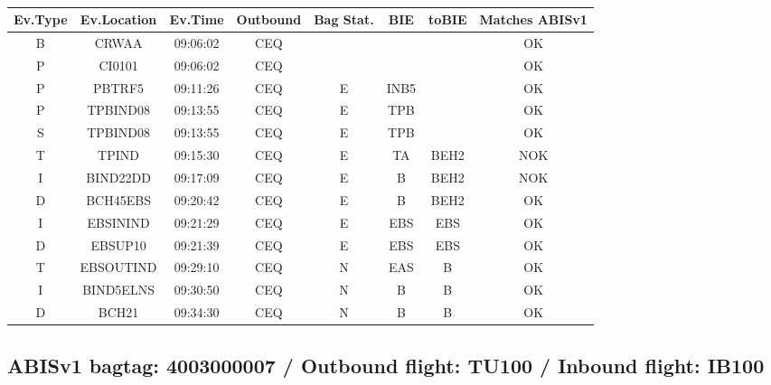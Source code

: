 \documentclass{report}
\begin{document}
\paragraph{}
\begin{longtable}{cccccccc}    \toprule
\rowcolor{white!50}
\textbf{Ev.Type} & \textbf{Ev.Location} & \textbf{Ev.Time} & \textbf{Outbound} & \textbf{Bag Stat.} & \textbf{BIE} & \textbf{toBIE} & \textbf{Matches ABISv1} \\\midrule
B & CRWAA & 09:06:02  & CEQ &  &  &  & OK\\
P & CI0101 & 09:06:02  & CEQ &  &  &  & OK\\
P & PBTRF5 & 09:11:26  & CEQ & E & INB5 &  & OK\\
P & TPBIND08 & 09:13:55  & CEQ & E & TPB &  & OK\\
S & TPBIND08 & 09:13:55  & CEQ & E & TPB &  & OK\\
T & TPIND & 09:15:30  & CEQ & E & TA & BEH2 & NOK\\
I & BIND22DD & 09:17:09  & CEQ & E & B & BEH2 & NOK\\
D & BCH45EBS & 09:20:42  & CEQ & E & B & BEH2 & OK\\
I & EBSININD & 09:21:29  & CEQ & E & EBS & EBS & OK\\
D & EBSUP10 & 09:21:39  & CEQ & E & EBS & EBS & OK\\
T & EBSOUTIND & 09:29:10  & CEQ & N & EAS & B & OK\\
I & BIND5ELNS & 09:30:50  & CEQ & N & B & B & OK\\
D & BCH21 & 09:34:30  & CEQ & N & B & B & OK\\
\bottomrule
\end{longtable}
\subsection*{ABISv1 bagtag: 4003000007 / Outbound flight: TU100 / Inbound flight: IB100}
\end{document}
